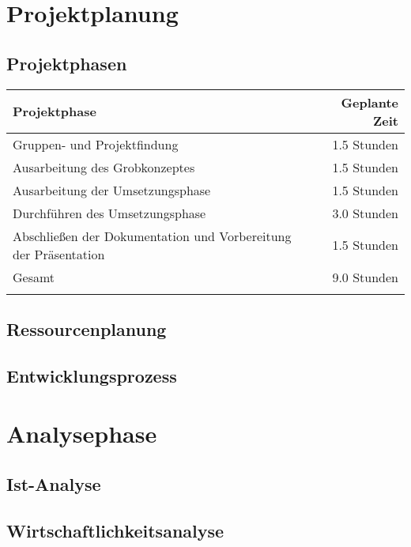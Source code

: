 \documentclass[ngerman,11pt,a4paper,titlepage]{article}
\begin{document}
	\section{Projektplanung}
	\label{sec:projektplanung}
	\projektplanungText
	
	\subsection{Projektphasen}
	\label{subsec:projektphasen}
	\projektphasenText
	\neuerAbsatz
	\begin{tabular}[h]{l|r}
		Projektphase & Geplante Zeit \\
		\hline
		Gruppen- und Projektfindung & 1.5 Stunden \\
		\hline
		Ausarbeitung des Grobkonzeptes & 1.5 Stunden \\
		\hline
		Ausarbeitung der Umsetzungsphase & 1.5 Stunden \\
		\hline
		Durchführen des Umsetzungsphase & 3.0 Stunden \\
		\hline
		Abschließen der Dokumentation und Vorbereitung der Präsentation & 1.5 Stunden \\
		\hline
		Gesamt & 9.0 Stunden \\
		\label{tab:tabelle1}
	\end{tabular}
	
	\subsection{Ressourcenplanung}
	\label{subsec:ressourcenplanung}
	\ressourcenplanungText
	
	\subsection{Entwicklungsprozess}
	\label{subsec:entwicklungsprozess}
	\entwicklungsprozessText
	
	\section{Analysephase}
	\label{sec:analysephase}
	\analysephaseText
	
	\subsection{Ist-Analyse}
	\label{subsec:istanalyse}
	\istanalyseText
	
	\subsection{Wirtschaftlichkeitsanalyse}
	\label{subsec:wirtschaftlichkeitsanalyse}
	\wirtschaftlichkeitsanalyseText
	
\end{document}
